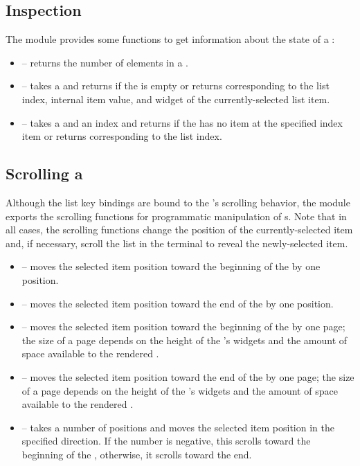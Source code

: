 \subsection{ Inspection}

The  module provides some functions to get information about
the state of a :

\begin{itemize}
\item {} -- returns the number of elements in a
  .
\item {} -- takes a  and returns
   if the  is empty or returns  corresponding to the list index, internal item
  value, and widget of the currently-selected list item.
\item {} -- takes a  and an index
  and returns  if the  has no item at the
  specified index item or returns 
  corresponding to the list index.
\end{itemize}

\subsection{Scrolling a }
\label{sec:list_scrolling}

Although the list key bindings are bound to the 's scrolling
behavior, the  module exports the scrolling functions for
programmatic manipulation of s.  Note that in all cases, the
scrolling functions change the position of the currently-selected item
and, if necessary, scroll the list in the terminal to reveal the
newly-selected item.

\begin{itemize}
\item {} -- moves the selected item position toward the
  beginning of the  by one position.
\item {} -- moves the selected item position toward the
  end of the  by one position.
\item {} -- moves the selected item position toward the
  beginning of the  by one page; the size of a page depends
  on the height of the 's widgets and the amount of space
  available to the rendered .
\item {} -- moves the selected item position toward the end
  of the  by one page; the size of a page depends on the
  height of the 's widgets and the amount of space available
  to the rendered .
\item {} -- takes a number of positions and moves the
  selected item position in the specified direction.  If the number is
  negative, this scrolls toward the beginning of the ,
  otherwise, it scrolls toward the end.
\end{itemize}

